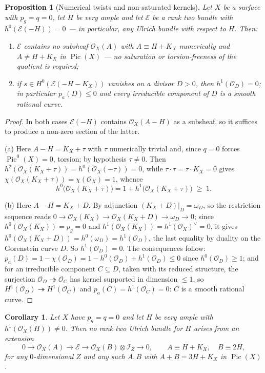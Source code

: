 \documentclass{amsart}
\newtheorem{proposition}[theorem]{Proposition}
\newtheorem{corollary}[theorem]{Corollary}
\theoremstyle{definition}
\newcommand{\OO}{\mathcal{O}}
\newcommand{\EE}{\mathcal{E}}
\newcommand{\II}{\mathcal{I}}
\newcommand{\Pic}{\operatorname{Pic}}
\begin{document}
\begin{proposition}[Numerical twists and non-saturated kernels]\label{prop:numkernel}
Let $X$ be a surface with $p_g=q=0$, let $H$ be very ample and let $\EE$ be a rank two bundle with $h^0(\EE(-H))=0$ --- in particular, any Ulrich bundle with respect to $H$. Then:
\begin{enumerate}[label=\textup{(\alph*)}]
\item $\EE$ contains no subsheaf $\OO_X(A)$ with $A\equiv H+K_X$ numerically and $A\neq H+K_X$ in $\Pic(X)$ --- no saturation or torsion-freeness of the quotient is required;
\item if $s\in H^0(\EE(-H-K_X))$ vanishes on a divisor $D>0$, then $h^1(\OO_D)=0$; in particular $p_a(D)\le0$ and every irreducible component of $D$ is a smooth rational curve.
\end{enumerate}
\end{proposition}

\begin{proof}
In both cases $\EE(-H)$ contains $\OO_X(A-H)$ as a subsheaf, so it suffices to produce a non-zero section of the latter.

(a) Here $A-H=K_X+\tau$ with $\tau$ numerically trivial and, since $q=0$ forces $\Pic^0(X)=0$, torsion; by hypothesis $\tau\neq0$. Then $h^2(\OO_X(K_X+\tau))=h^0(\OO_X(-\tau))=0$, while $\tau\cdot\tau=\tau\cdot K_X=0$ gives $\chi(\OO_X(K_X+\tau))=\chi(\OO_X)=1$, whence
\[
h^0\bigl(\OO_X(K_X+\tau)\bigr)=1+h^1\bigl(\OO_X(K_X+\tau)\bigr)\;\ge\;1 .
\]

(b) Here $A-H=K_X+D$. By adjunction $(K_X+D)|_D=\omega_D$, so the restriction sequence reads $0\to\OO_X(K_X)\to\OO_X(K_X+D)\to\omega_D\to0$; since $h^0(\OO_X(K_X))=p_g=0$ and $h^1(\OO_X(K_X))=h^1(\OO_X)^\vee=0$, it gives $h^0(\OO_X(K_X+D))=h^0(\omega_D)=h^1(\OO_D)$, the last equality by duality on the Gorenstein curve $D$. So $h^1(\OO_D)=0$. The consequences follow: $p_a(D)=1-\chi(\OO_D)=1-h^0(\OO_D)+h^1(\OO_D)\le0$ since $h^0(\OO_D)\ge1$; and for an irreducible component $C\subseteq D$, taken with its reduced structure, the surjection $\OO_D\twoheadrightarrow\OO_C$ has kernel supported in dimension $\le1$, so $H^1(\OO_D)\twoheadrightarrow H^1(\OO_C)$ and $p_a(C)=h^1(\OO_C)=0$: $C$ is a smooth rational curve.
\end{proof}

\begin{corollary}\label{cor:numerical-nogo}
Let $X$ have $p_g=q=0$ and let $H$ be very ample with $h^1(\OO_X(H))\neq0$. Then no rank two Ulrich bundle for $H$ arises from an extension
\[
0\longrightarrow\OO_X(A)\longrightarrow\EE\longrightarrow\OO_X(B)\otimes\II_Z\longrightarrow0,\qquad A\equiv H+K_X,\quad B\equiv 2H ,
\]
for any $0$-dimensional $Z$ and any such $A,B$ with $A+B=3H+K_X$ in $\Pic(X)$.
\end{corollary}
\end{document}
